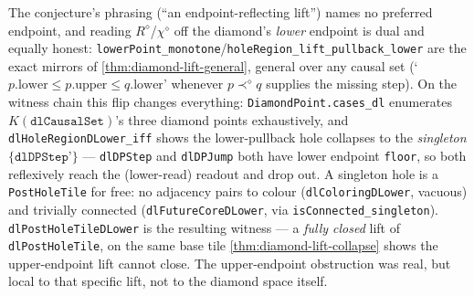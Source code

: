 \begin{theorem}\label{thm:diamond-lift-lower-closes}\leanok{}
The conjecture's phrasing (``an endpoint-reflecting lift'') names no preferred endpoint, and reading
$R^\diamond$/$\chi^\diamond$ off the diamond's \emph{lower} endpoint is dual and equally honest:
\texttt{lowerPoint\_monotone}/\texttt{holeRegion\_lift\_pullback\_lower} are the exact mirrors of
\cref{thm:diamond-lift-general}, general over any causal set (`$p.\text{lower} \le p.\text{upper}
\le q.\text{lower}$' whenever $p \prec^\diamond q$ supplies the missing step). On the witness chain
this flip changes everything: \texttt{DiamondPoint.cases\_dl} enumerates $K(\texttt{dlCausalSet})$'s
three diamond points exhaustively, and \texttt{dlHoleRegionDLower\_iff} shows the lower-pullback hole
collapses to the \emph{singleton} $\{\texttt{dlDPStep'}\}$ --- \texttt{dlDPStep} and
\texttt{dlDPJump} both have lower endpoint \texttt{floor}, so both reflexively reach the (lower-read)
readout and drop out. A singleton hole is a \texttt{PostHoleTile} for free: no adjacency pairs to
colour (\texttt{dlColoringDLower}, vacuous) and trivially connected
(\texttt{dlFutureCoreDLower}, via \texttt{isConnected\_singleton}). \texttt{dlPostHoleTileDLower}
is the resulting witness --- a \emph{fully closed} lift of \texttt{dlPostHoleTile}, on the same base
tile \cref{thm:diamond-lift-collapse} shows the upper-endpoint lift cannot close. The upper-endpoint
obstruction was real, but local to that specific lift, not to the diamond space itself.
\end{theorem}

